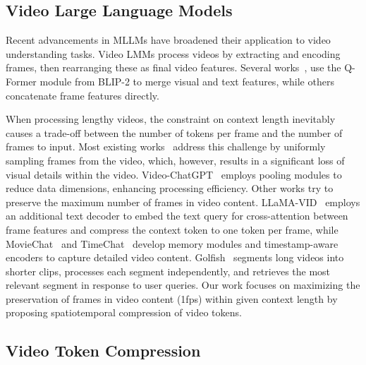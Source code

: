 \subsection{Video Large Language Models}

Recent advancements in MLLMs have broadened their application to video understanding tasks. Video LMMs process videos by extracting and encoding frames, then rearranging these as final video features. Several works~\citep{li2023videochat,li2024mvbench,cheng2024videollama}, use the Q-Former module from BLIP-2 to merge visual and text features, while others~\citep{lin2023video,luo2023valley,ataallah2024minigpt4} concatenate frame features directly. 

When processing lengthy videos, the constraint on context length inevitably causes a trade-off between the number of tokens per frame and the number of frames to input. Most existing works~\citep{li2023videochat,ataallah2024minigpt4,cheng2024videollama,zhang2024llavanextvideo,li2024llava} address this challenge by uniformly sampling frames from the video, which, however, results in a significant loss of visual details within the video. Video-ChatGPT~\citep{maaz2023videochatgpt} employs pooling modules to reduce data dimensions, enhancing processing efficiency. Other works try to preserve the maximum number of frames in video content. LLaMA-VID~\citep{li2023llama} employs an additional text decoder to embed the text query for cross-attention between frame features and compress the context token to one token per frame, while MovieChat~\citep{song2023moviechat} and TimeChat~\citep{ren2023timechat} develop memory modules and timestamp-aware encoders to capture detailed video content. Golfish~\citep{ataallah2024goldfish} segments long videos into shorter clips, processes each segment independently, and retrieves the most relevant segment in response to user queries. Our work focuses on maximizing the preservation of frames in video content (1fps) within given context length by proposing spatiotemporal compression of video tokens.

\subsection{Video Token Compression}

